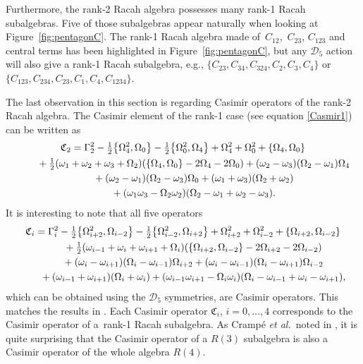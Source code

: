 \documentclass[10pt,a4paper]{amsart}
\numberwithin{equation}{section}
\begin{document}
Furthermore, the rank-2 Racah algebra possesses many rank-1 Racah subalgebras. Five of those subalgebras appear naturally when looking at Figure~\ref{fig:pentagonC}. The rank-1 Racah algebra made of~$C_{12}$,~$C_{23}$, $C_{123}$ and central terms has been highlighted in Figure~\ref{fig:pentagonC}, but any $\mathcal{D}_5$ action will also give a rank-1 Racah subalgebra, e.g., $\lbrace\! C_{23},C_{34},C_{324},C_2,C_3,C_4\!\rbrace$ or $\lbrace \!C_{123},C_{234},C_{23},C_{\!1},C_4,C_{1234}\!\rbrace$.

The last observation in this section is regarding Casimir operators of the rank-2 Racah algebra. The Casimir element of the rank-1 case (see equation \eqref{Casmir1}) can be written as
\begin{gather*}
\mathfrak{C}_2= \Gamma_2^2-\tfrac{1}{2}\big\lbrace \Omega_4^2,\Omega_0\big\rbrace-\tfrac{1}{2}\big\lbrace \Omega_0^2,\Omega_4\big\rbrace+\Omega_4^2+\Omega_0^2+\lbrace \Omega_4,\Omega_0\rbrace\\
\hphantom{\mathfrak{C}_2=}{}
+\tfrac{1}{2}(\omega_1+\omega_2+\omega_3+\Omega_2)(\lbrace \Omega_4,\Omega_0\rbrace-2\Omega_4-2\Omega_0)+(\omega_2-\omega_3)(\Omega_2-\omega_1)\Omega_4\\
\hphantom{\mathfrak{C}_2=}{}+(\omega_2-\omega_1)(\Omega_2-\omega_3)\Omega_0+(\omega_1+\omega_3)(\Omega_2+\omega_2)\\
\hphantom{\mathfrak{C}_2=}{}+(\omega_1\omega_3-\Omega_2\omega_2)(\Omega_2-\omega_1+\omega_2-\omega_3).
\end{gather*}
It is interesting to note that all five operators
\begin{gather*}
\mathfrak{C}_i= \Gamma_i^2-\tfrac{1}{2}\big\lbrace \Omega_{i+2}^2,\Omega_{i-2}\big\rbrace-\tfrac{1}{2}\big\lbrace \Omega_{i-2}^2,\Omega_{i+2}\big\rbrace+\Omega_{i+2}^2+\Omega_{i-2}^2+\lbrace \Omega_{i+2},\Omega_{i-2}\rbrace\\
\hphantom{\mathfrak{C}_i=}{} +\tfrac{1}{2}(\omega_{i-1}+\omega_i+\omega_{i+1}+\Omega_i)(\lbrace \Omega_{i+2},\Omega_{i-2}\rbrace-2\Omega_{i+2}-2\Omega_{i-2})\\
\hphantom{\mathfrak{C}_i=}{}+(\omega_i-\omega_{i+1})(\Omega_i-\omega_{i-1})\Omega_{i+2}+(\omega_i-\omega_{i-1})(\Omega_i-\omega_{i+1})\Omega_{i-2}\\
\hphantom{\mathfrak{C}_i=}{}+(\omega_{i-1}+\omega_{i+1})(\Omega_i+\omega_i)+(\omega_{i-1}\omega_{i+1}-\Omega_i\omega_i)(\Omega_i-\omega_{i-1}+\omega_i-\omega_{i+1}),
\end{gather*}
which can be obtained using the $\mathcal{D}_5$ symmetries, are Casimir operators. This matches the results in \cite{Crampe2023,GVZ2013,GZ88}. Each Casimir operator $\mathfrak{C}_i$, $i=0,\dots,4$ corresponds to the Casimir operator of a~rank-1 Racah subalgebra. As Cramp\'e \textit{et al.}~noted in \cite{Crampe2023}, it is quite surprising that the Casimir operator of a $R(3)$ subalgebra is also a Casimir operator of the whole algebra $R(4)$.
\end{document}
